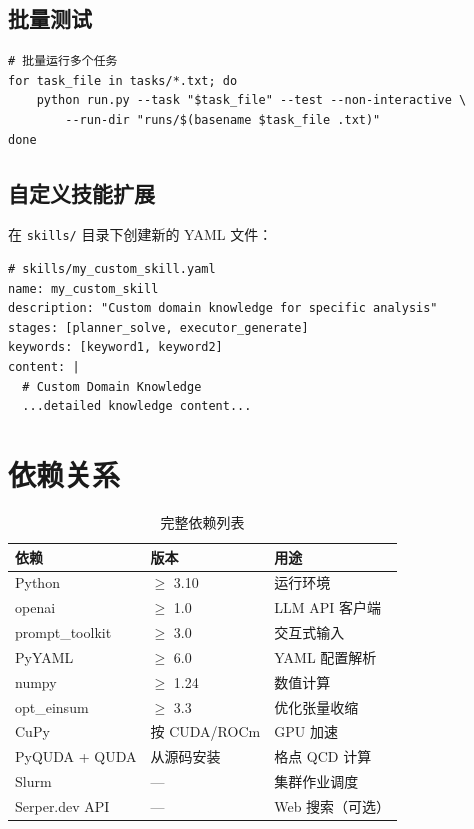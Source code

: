 \documentclass[12pt,a4paper]{ctexart}
\begin{document}
\subsection{批量测试}

\begin{lstlisting}[style=bashcode]
# 批量运行多个任务
for task_file in tasks/*.txt; do
    python run.py --task "$task_file" --test --non-interactive \
        --run-dir "runs/$(basename $task_file .txt)"
done
\end{lstlisting}

\subsection{自定义技能扩展}

在 \texttt{skills/} 目录下创建新的 YAML 文件：

\begin{lstlisting}[style=yamlcode]
# skills/my_custom_skill.yaml
name: my_custom_skill
description: "Custom domain knowledge for specific analysis"
stages: [planner_solve, executor_generate]
keywords: [keyword1, keyword2]
content: |
  # Custom Domain Knowledge
  ...detailed knowledge content...
\end{lstlisting}

\section{依赖关系}

\begin{table}[h]
\centering
\begin{tabular}{@{}lll@{}}
\toprule
\textbf{依赖}          & \textbf{版本}  & \textbf{用途} \\
\midrule
Python                 & $\ge$ 3.10     & 运行环境 \\
openai                 & $\ge$ 1.0      & LLM API 客户端 \\
prompt\_toolkit        & $\ge$ 3.0      & 交互式输入 \\
PyYAML                 & $\ge$ 6.0      & YAML 配置解析 \\
numpy                  & $\ge$ 1.24     & 数值计算 \\
opt\_einsum            & $\ge$ 3.3      & 优化张量收缩 \\
CuPy                   & 按 CUDA/ROCm   & GPU 加速 \\
PyQUDA + QUDA          & 从源码安装      & 格点 QCD 计算 \\
Slurm                  & —              & 集群作业调度 \\
Serper.dev API         & —              & Web 搜索（可选）\\
\bottomrule
\end{tabular}
\caption{完整依赖列表}
\end{table}
\end{document}
